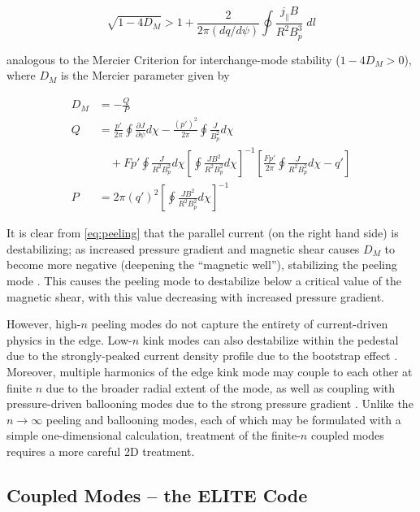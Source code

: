 \begin{equation}\label{eq:peeling}
 \sqrt{1 - 4D_M} > 1 + \frac{2}{2\pi \left(dq/d\psi\right)} \oint \frac{j_\parallel B}{R^2 B_p^3} \;dl
\end{equation}

\noindent analogous to the Mercier Criterion \cite{Mercier1960} for interchange-mode stability ($1 - 4D_M > 0$), where $D_M$ is the Mercier parameter given by

\begin{equation}\label{eq:mercier}
 \begin{aligned}
  D_M &= -\frac{Q}{P}\\
  Q &= \frac{p'}{2\pi} \oint \frac{\partial J}{\partial \psi} d\chi - \frac{\left(p'\right)^2}{2\pi} \oint \frac{J}{B_p^2} d\chi\\
  &\quad + Fp' \oint \frac{J}{R^2 B_p^2} d\chi \left[ \oint \frac{JB^2}{R^2 B_p^2} d\chi \right]^{-1} \left[ \frac{Fp'}{2\pi} \oint \frac{J}{R^2 B_p^2} d\chi - q' \right]\\
  P &= 2\pi\left(q'\right)^2 \left[ \oint \frac{JB^2}{R^2 B_p^2} d\chi \right]^{-1}
 \end{aligned}
\end{equation}

\noindent It is clear from \cref{eq:peeling} that the parallel current (on the right hand side) is destabilizing; as increased pressure gradient and magnetic shear causes $D_M$ to become more negative (deepening the ``magnetic well''), stabilizing the peeling mode \cite{Snyder2002,Snyder2004}.  This causes the peeling mode to destabilize below a critical value of the magnetic shear, with this value decreasing with increased pressure gradient.

However, high-$n$ peeling modes do not capture the entirety of current-driven physics in the edge.  Low-$n$ kink modes can also destabilize within the pedestal due to the strongly-peaked current density profile due to the bootstrap effect \cite{Snyder2002}.  Moreover, multiple harmonics of the edge kink mode may couple to each other at finite $n$ due to the broader radial extent of the mode, as well as coupling with pressure-driven ballooning modes due to the strong pressure gradient \cite{Wilson1999,Snyder2004}.  Unlike the $n \rightarrow \infty$ peeling and ballooning modes, each of which may be formulated with a simple one-dimensional calculation, treatment of the finite-$n$ coupled modes requires a more careful 2D treatment.

\subsection{Coupled Modes -- the ELITE Code}\label{subsec:mod_elite}

